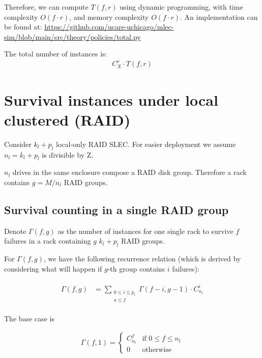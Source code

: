 \documentclass{article}
\begin{document}
Therefore, we can compute $T(f,r)$ using dynamic programming, with time complexity $O(f \cdot r)$, and memory complexity $O(f \cdot r)$. An implementation can be found at: \url{https://github.com/ucare-uchicago/mlec-sim/blob/main/src/theory/policies/total.py}

The total number of instances is:
\begin{eqnarray}
  C_{X}^{r} \cdot T(f,r)
\label{eq:total:final}
\end{eqnarray}




\section{Survival instances under local clustered (RAID)}\label{sec-raid}

Consider $k_l+p_l$ local-only RAID SLEC. For easier deployment we assume $n_l=k_l+p_l$ is divisible by Z.

$n_l$ drives in the same enclosure compose a RAID disk group. Therefore a rack contains $g = M/n_l$ RAID groups.

\subsection{Survival counting in a single RAID group}

Denote $\Gamma(f, g)$ as the number of instances for one single rack to survive $f$ failures in a rack containing $g$ $k_l+p_l$ RAID groups.

For $\Gamma(f, g)$, we have the following recurrence relation (which is derived by considering what will happen if $g$-th group contains $i$ failures):

\begin{eqnarray}
\begin{aligned}
  \Gamma(f, g) &= \sum_{\substack{0 \leq i \leq p_l \\ a\leq f}} \Gamma(f-i, g-1) \cdot C_{n_l}^i
\end{aligned}
\label{eq:raid:1}
\end{eqnarray}

The base case is 

\begin{eqnarray}
  \Gamma(f, 1) =
    \begin{cases}
      C_{n_l}^f& \text{if $0 \leq f \leq n_l$}\\
      0 & \text{otherwise}
    \end{cases}       
\label{eq:raid:2}
\end{eqnarray}
\end{document}
